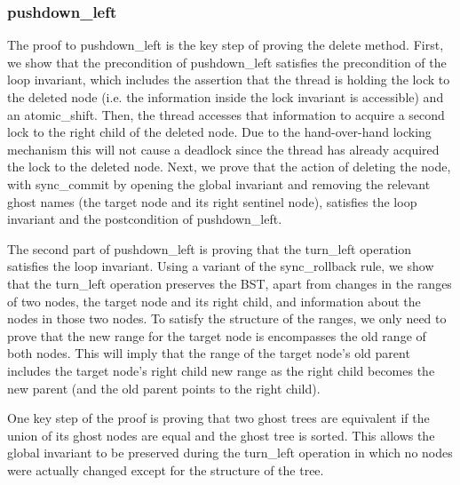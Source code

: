 \documentclass[a4paper,USenglish,cleveref, autoref, thm-restate]{lipics-v2021}
\begin{document}
\subsubsection{pushdown\_left}

The proof to pushdown\_left is the key step of proving the delete method. 
First, we show that the precondition of pushdown\_left satisfies the precondition
of the loop invariant, which includes the assertion that the thread is holding the 
lock to the deleted node (i.e. the information inside the lock invariant is accessible)
and an atomic\_shift. Then, the thread accesses that information to acquire a second 
lock to the right child of the deleted node. Due to the hand-over-hand locking 
mechanism this will not cause a deadlock since the thread has already acquired the 
lock to the deleted node. Next, we prove that the action of deleting the node,
with sync\_commit by opening the global invariant and removing the relevant 
ghost names (the target node and its right sentinel node), satisfies the loop
invariant and the postcondition of pushdown\_left.

The second part of pushdown\_left is proving that the turn\_left operation satisfies
the loop invariant. Using a variant of the sync\_rollback rule, we show that the 
turn\_left operation preserves the BST, apart from changes in the ranges of two nodes,
the target node and its right child, and information about the nodes in those two nodes.
To satisfy the structure of the ranges, we only need to prove that the new range for
the target node is encompasses the old range of both nodes. This will imply that
the range of the target node's old parent includes the target node's right child 
new range as the right child becomes the new parent (and the old parent points to 
the right child).

One key step of the proof is proving that two ghost trees are equivalent if the union
of its ghost nodes are equal and the ghost tree is sorted. This allows the global invariant
to be preserved during the turn\_left operation in which no nodes were actually changed
except for the structure of the tree.
\end{document}
